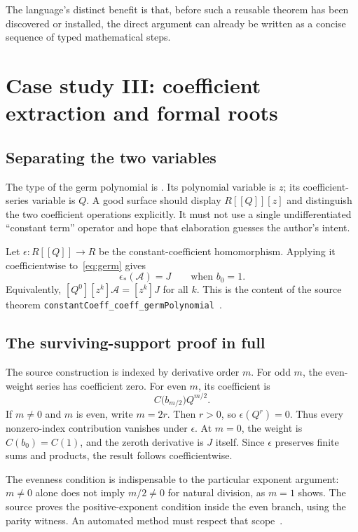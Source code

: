 \documentclass[11pt,letterpaper]{article}
\theoremstyle{definition}
\theoremstyle{remark}
\newcommand{\code}[1]{\texttt{\detokenize{#1}}}
\newcommand{\decl}[1]{{\small\urlstyle{tt}\nolinkurl{#1}}}
\begin{document}
The language's distinct benefit is that, before such a reusable theorem has been discovered or installed, the direct argument can already be written as a concise sequence of typed mathematical steps.

\section{Case study III: coefficient extraction and formal roots}
\label{sec:germ-case}
\subsection{Separating the two variables}
The type of the germ polynomial is \code{Polynomial (PowerSeries R)}. Its polynomial variable is $z$; its coefficient-series variable is $Q$. A good surface should display $R[[Q]][z]$ and distinguish the two coefficient operations explicitly. It must not use a single undifferentiated ``constant term'' operator and hope that elaboration guesses the author's intent.

Let $\epsilon:R[[Q]]\to R$ be the constant-coefficient homomorphism. Applying it coefficientwise to~\eqref{eq:germ} gives
\[
 \epsilon_*(\mathcal A)=J \qquad\text{when }b_0=1.
\]
Equivalently, $[Q^0][z^k]\mathcal A=[z^k]J$ for all $k$. This is the content of the source theorem \decl{constantCoeff_coeff_germPolynomial}~\cite{germ}.

\subsection{The surviving-support proof in full}
The source construction is indexed by derivative order $m$. For odd $m$, the even-weight series has coefficient zero. For even $m$, its coefficient is
\[
 C\bigl(b_{m/2}\bigr)Q^{m/2}.
\]
If $m\ne0$ and $m$ is even, write $m=2r$. Then $r>0$, so $\epsilon(Q^r)=0$. Thus every nonzero-index contribution vanishes under $\epsilon$. At $m=0$, the weight is $C(b_0)=C(1)$, and the zeroth derivative is $J$ itself. Since $\epsilon$ preserves finite sums and products, the result follows coefficientwise.

The evenness condition is indispensable to the particular exponent argument: $m\ne0$ alone does not imply $m/2\ne0$ for natural division, as $m=1$ shows. The source proves the positive-exponent condition inside the even branch, using the parity witness. An automated method must respect that scope~\cite{germ}.
\end{document}
